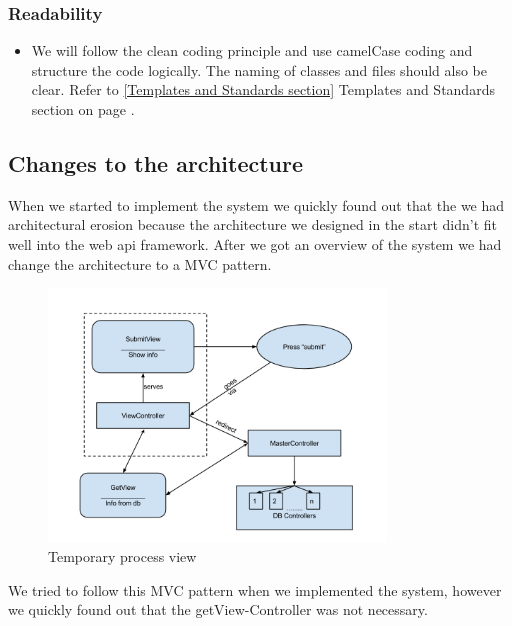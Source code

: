\subsubsection{Readability}
\begin{itemize}
\item We will follow the clean coding principle and use camelCase coding and structure the code logically. The naming of classes and files should also be clear. Refer to \ref{Templates and Standards section} Templates and Standards section on page \pageref{Templates and Standards section}.
\end{itemize}

\subsection{Changes to the architecture}
When we started to implement the system we quickly found out that the we had architectural erosion because the architecture we designed in the start didn't fit well into the web api framework. After we got an overview of the system we had change the architecture to a MVC pattern. 
\begin{figure}[H]
\centering
\includegraphics[width=0.8\textwidth]{images/architecture03_revised1.png}
\caption{Temporary process view}
\label{fig:info_flow}
\end{figure}
We tried to follow this MVC pattern when we implemented the system, however we quickly found out that the getView-Controller was not necessary.
